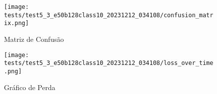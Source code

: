 \begin{figure}[ht]
 \begin{center}
   \texttt{[image: tests/test5\_3\_e50b128class10\_20231212\_034108/confusion\_matrix.png]}
  \caption{Matriz de Confusão}
  \label{fig:fig03}
 \end{center}
\end{figure}

\begin{figure}[ht]
 \begin{center}
   \texttt{[image: tests/test5\_3\_e50b128class10\_20231212\_034108/loss\_over\_time.png]}
  \caption{Gráfico de Perda}
  \label{fig:fig04}
 \end{center}
\end{figure}
